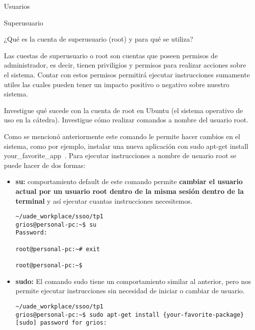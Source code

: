 \begin{section}{Usuarios}

\begin{subsection}{Superusuario}
\begin{quoting}
¿Qué es la cuenta de superusuario (root) y para qué se utiliza?
\end{quoting}

Las cuestas de superusuario o root son cuentas que poseen permisos de administrador, es decir, tienen priviligios y permisos para realizar acciones sobre el sistema. Contar con estos permisos permitirá ejecutar instrucciones sumamente utiles las cuales pueden tener un impacto positivo o negativo sobre nuestro sistema.

\hfill

\begin{quoting}
Investigue qué sucede con la cuenta de root en Ubuntu (el sistema operativo de uso en la cátedra). Investigue cómo realizar comandos a nombre del usuario root.
\end{quoting}

Como se mencionó anteriormente este comando le permite hacer cambios en el sistema, como por ejemplo, instalar una nueva aplicación con \guillemotleft sudo apt-get install your\_favorite\_app\ \guillemotright. Para ejecutar instrucciones a nombre de usuario root se puede hacer de dos formas:

\begin{itemize}

\item \textbf{su:}
comportamiento default de este comando permite \textbf{cambiar el usuario actual por un usuario root dentro de la misma sesión dentro de la terminal} y así ejecutar cuantas instrucciones necesitemos.

\begin{lstlisting}[style=Ubuntu]
~/uade_workplace/ssoo/tp1
grios@personal-pc:~$ su
Password: 

root@personal-pc:~# exit

root@personal-pc:~$ 
\end{lstlisting}

\item \textbf{sudo:}
El comando sudo tiene un comportamiento similar al anterior, pero nos permite ejecutar instrucciones sin necesidad de iniciar o cambiar de usuario.

\begin{lstlisting}[style=Ubuntu]
~/uade_workplace/ssoo/tp1
grios@personal-pc:~$ sudo apt-get install {your-favorite-package}        
[sudo] password for grios: 
\end{lstlisting}


\end{itemize}
\end{subsection}
\end{section}
